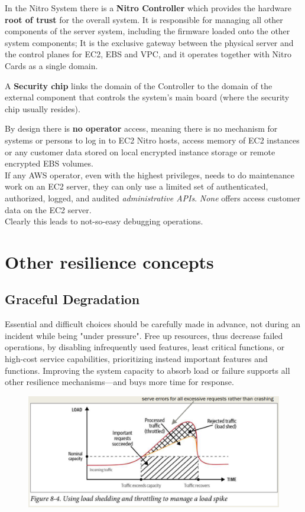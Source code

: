 In the Nitro System there is a \textbf{Nitro Controller} which provides the hardware \textbf{root of trust} for the overall system.
It is responsible for
managing all other components of the server system, including the firmware
loaded onto the other system components;
It is the exclusive gateway between the physical server and the control planes for EC2, EBS and VPC, 
and it operates together with Nitro Cards as a single domain.

A \textbf{Security chip} links the domain of the Controller to the domain of the external component that controls the system's main board (where the security chip usually resides).


By design there is \textbf{no operator} access, 
meaning there is no mechanism for systems or
persons to log in to EC2 Nitro hosts, access memory of EC2 instances
or any customer data stored on local encrypted instance storage or
remote encrypted EBS volumes.\\
If any AWS operator, even with the highest privileges, needs to do
maintenance work on an EC2 server, they can only use a limited set of
authenticated, authorized, logged, and audited \textit{administrative APIs}.
\textit{None} offers access customer data on the EC2 server.\\
Clearly this leads to not-so-easy debugging operations.

\section{Other resilience concepts}
\subsection{Graceful Degradation}
Essential and difficult choices should be carefully made in advance, not during an incident while being "under pressure".
Free up resources, thus decrease failed operations, by disabling infrequently used
features, least critical functions, or high-cost service capabilities,
prioritizing instead important features and functions.
Improving the system capacity to absorb load or failure supports all other
resilience mechanisms—and buys more time for response.

\begin{figure}[htbp]
   \centering
   \includegraphics{images/graceful_degradation.png}
   \label{fig:graceful_degradation}
\end{figure}

